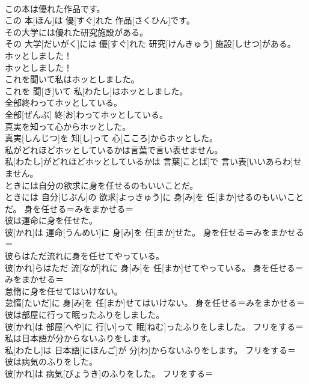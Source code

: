 \documentclass[8pt]{extreport}
\begin{document}
\begin{CJK}{UTF8}{min}
\\	この本は優れた作品です。	
\\	この 本[ほん]は 優[すぐ]れた 作品[さくひん]です。	
\\	その大学には優れた研究施設がある。	
\\	その 大学[だいがく]には 優[すぐ]れた 研究[けんきゅう] 施設[しせつ]がある。	
\\	ホッとしました！	
\\	ホッとしました！	
\\	これを聞いて私はホッとしました。	
\\	これを 聞[き]いて 私[わたし]はホッとしました。	
\\	全部終わってホッとしている。	
\\	全部[ぜんぶ] 終[お]わってホッとしている。	
\\	真実を知って心からホッとした。	
\\	真実[しんじつ]を 知[し]って 心[こころ]からホッとした。	
\\	私がどれほどホッとしているかは言葉で言い表せません。	
\\	私[わたし]がどれほどホッとしているかは 言葉[ことば]で 言い表[いいあらわ]せません。	
\\	ときには自分の欲求に身を任せるのもいいことだ。	
\\	ときには 自分[じぶん]の 欲求[よっきゅう]に 身[み]を 任[まか]せるのもいいことだ。	身を任せる＝みをまかせる＝ 
\\	彼は運命に身を任せた。	
\\	彼[かれ]は 運命[うんめい]に 身[み]を 任[まか]せた。	身を任せる＝みをまかせる＝ 
\\	彼らはただ流れに身を任せてやっている。	
\\	彼[かれ]らはただ 流[なが]れに 身[み]を 任[まか]せてやっている。	身を任せる＝みをまかせる＝ 
\\	怠惰に身を任せてはいけない。	
\\	怠惰[たいだ]に 身[み]を 任[まか]せてはいけない。	身を任せる＝みをまかせる＝ 
\\	彼は部屋に行って眠ったふりをしました。	
\\	彼[かれ]は 部屋[へや]に 行[い]って 眠[ねむ]ったふりをしました。	フリをする＝ 
\\	私は日本語が分からないふりをします。	
\\	私[わたし]は 日本語[にほんご]が 分[わ]からないふりをします。	フリをする＝ 
\\	彼は病気のふりをした。	
\\	彼[かれ]は 病気[びょうき]のふりをした。	フリをする＝ 

\end{CJK}
\end{document}
